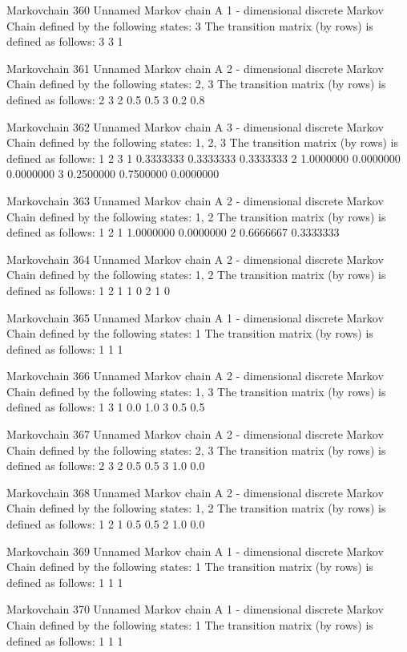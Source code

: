 \documentclass[
  nojss]{jss}
\begin{document}
\begin{CodeChunk}
\begin{CodeOutput}
Markovchain  360 
Unnamed Markov chain 
 A  1 - dimensional discrete Markov Chain defined by the following states: 
 3 
 The transition matrix  (by rows)  is defined as follows: 
  3
3 1

Markovchain  361 
Unnamed Markov chain 
 A  2 - dimensional discrete Markov Chain defined by the following states: 
 2, 3 
 The transition matrix  (by rows)  is defined as follows: 
    2   3
2 0.5 0.5
3 0.2 0.8

Markovchain  362 
Unnamed Markov chain 
 A  3 - dimensional discrete Markov Chain defined by the following states: 
 1, 2, 3 
 The transition matrix  (by rows)  is defined as follows: 
          1         2         3
1 0.3333333 0.3333333 0.3333333
2 1.0000000 0.0000000 0.0000000
3 0.2500000 0.7500000 0.0000000

Markovchain  363 
Unnamed Markov chain 
 A  2 - dimensional discrete Markov Chain defined by the following states: 
 1, 2 
 The transition matrix  (by rows)  is defined as follows: 
          1         2
1 1.0000000 0.0000000
2 0.6666667 0.3333333

Markovchain  364 
Unnamed Markov chain 
 A  2 - dimensional discrete Markov Chain defined by the following states: 
 1, 2 
 The transition matrix  (by rows)  is defined as follows: 
  1 2
1 1 0
2 1 0

Markovchain  365 
Unnamed Markov chain 
 A  1 - dimensional discrete Markov Chain defined by the following states: 
 1 
 The transition matrix  (by rows)  is defined as follows: 
  1
1 1

Markovchain  366 
Unnamed Markov chain 
 A  2 - dimensional discrete Markov Chain defined by the following states: 
 1, 3 
 The transition matrix  (by rows)  is defined as follows: 
    1   3
1 0.0 1.0
3 0.5 0.5

Markovchain  367 
Unnamed Markov chain 
 A  2 - dimensional discrete Markov Chain defined by the following states: 
 2, 3 
 The transition matrix  (by rows)  is defined as follows: 
    2   3
2 0.5 0.5
3 1.0 0.0

Markovchain  368 
Unnamed Markov chain 
 A  2 - dimensional discrete Markov Chain defined by the following states: 
 1, 2 
 The transition matrix  (by rows)  is defined as follows: 
    1   2
1 0.5 0.5
2 1.0 0.0

Markovchain  369 
Unnamed Markov chain 
 A  1 - dimensional discrete Markov Chain defined by the following states: 
 1 
 The transition matrix  (by rows)  is defined as follows: 
  1
1 1

Markovchain  370 
Unnamed Markov chain 
 A  1 - dimensional discrete Markov Chain defined by the following states: 
 1 
 The transition matrix  (by rows)  is defined as follows: 
  1
1 1


\end{CodeOutput}
\end{CodeChunk}
\end{document}
